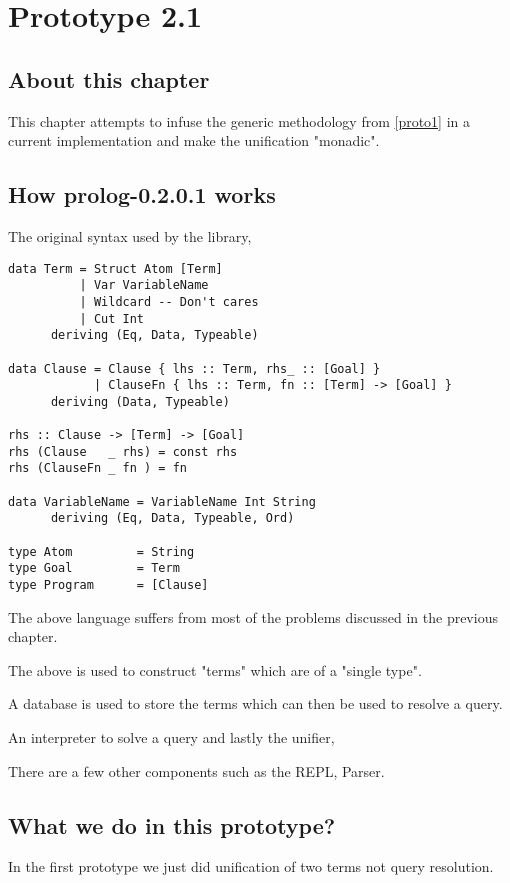 \documentclass[thesis-solanki.tex]{subfiles}
\begin{document}
\chapter{Prototype 2.1}{\label{proto2.1}}

\section{About this chapter}
This chapter attempts to infuse the generic methodology from \ref{proto1} in a current  implementation \cite{prolog-lib}
and make the unification "monadic".

\section{How prolog-0.2.0.1 works}

The original syntax used by the library,

\begin{verbatim}
data Term = Struct Atom [Term]
          | Var VariableName
          | Wildcard -- Don't cares 
          | Cut Int
      deriving (Eq, Data, Typeable)

data Clause = Clause { lhs :: Term, rhs_ :: [Goal] }
            | ClauseFn { lhs :: Term, fn :: [Term] -> [Goal] }
      deriving (Data, Typeable)

rhs :: Clause -> [Term] -> [Goal]      
rhs (Clause   _ rhs) = const rhs
rhs (ClauseFn _ fn ) = fn

data VariableName = VariableName Int String
      deriving (Eq, Data, Typeable, Ord)

type Atom         = String
type Goal         = Term
type Program      = [Clause]
\end{verbatim} 

The above language suffers from most of the problems discussed in the previous chapter.

The above is used to construct  "terms" which are of a "single type".   

A database is used to store the terms which can then be used to resolve a query.

An interpreter to solve a query and lastly the unifier,

 


There are a few other components such as the REPL, Parser. 



\section{What we do in this prototype?}
In the first prototype we just did unification of two terms not query resolution.
\end{document}
